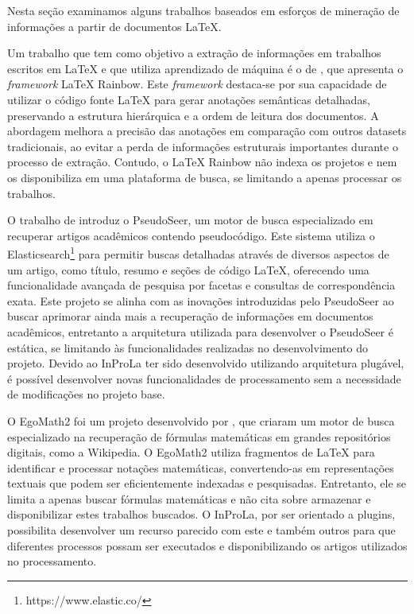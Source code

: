 \documentclass[12pt]{article}
\begin{document}
Nesta seção examinamos alguns trabalhos baseados em esforços de mineração de informações a partir de documentos LaTeX.

Um trabalho que tem como objetivo a extração de informações em trabalhos escritos em LaTeX e que utiliza aprendizado de máquina é o de \cite{duan2023latex}, que apresenta o \textit{framework} LaTeX Rainbow. Este \textit{framework} destaca-se por sua capacidade de utilizar o código fonte LaTeX para gerar anotações semânticas detalhadas, preservando a estrutura hierárquica e a ordem de leitura dos documentos. A abordagem melhora a precisão das anotações em comparação com outros datasets tradicionais, ao evitar a perda de informações estruturais importantes durante o processo de extração. Contudo, o LaTeX Rainbow não indexa os projetos e nem os disponibiliza em uma plataforma de busca, se limitando a apenas processar os trabalhos.

O trabalho de \cite{toksoz2024pseudoseer} introduz o PseudoSeer, um motor de busca especializado em recuperar artigos acadêmicos contendo pseudocódigo. Este sistema utiliza o Elasticsearch\footnote{https://www.elastic.co/} para permitir buscas detalhadas através de diversos aspectos de um artigo, como título, resumo e seções de código LaTeX, oferecendo uma funcionalidade avançada de pesquisa por facetas e consultas de correspondência exata. Este projeto se alinha com as inovações introduzidas pelo PseudoSeer ao buscar aprimorar ainda mais a recuperação de informações em documentos acadêmicos, entretanto a arquitetura utilizada para desenvolver o PseudoSeer é estática, se limitando às funcionalidades realizadas no desenvolvimento do projeto. Devido ao InProLa ter sido desenvolvido utilizando arquitetura plugável, é possível desenvolver novas funcionalidades de processamento sem a necessidade de modificações no projeto base.

O EgoMath2 foi um projeto desenvolvido por \cite{10.1007/978-3-642-22673-1_30}, que criaram um motor de busca especializado na recuperação de fórmulas matemáticas em grandes repositórios digitais, como a Wikipedia. O EgoMath2 utiliza fragmentos de LaTeX para identificar e processar notações matemáticas, convertendo-as em representações textuais que podem ser eficientemente indexadas e pesquisadas. Entretanto, ele se limita a apenas buscar fórmulas matemáticas e não cita sobre armazenar e disponibilizar estes trabalhos buscados. O InProLa, por ser orientado a plugins, possibilita desenvolver um recurso parecido com este e também outros para que diferentes processos possam ser executados e disponibilizando os artigos utilizados no processamento.
\end{document}

